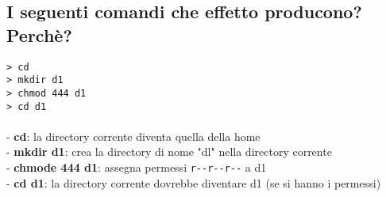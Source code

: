 \subsection{I seguenti comandi che effetto producono? Perch\`e?}
\texttt{> cd	\\
> mkdir d1	\\
> chmod 444	d1	\\
> cd d1	\\}
\\
- \textbf{cd}: la directory corrente diventa quella della home	\\
- \textbf{mkdir d1}: crea la directory di nome "dl" nella directory
corrente	\\
- \textbf{chmode 444 d1}: assegna permessi \verb:r--r--r--: a d1	\\
- \textbf{cd d1}: la directory corrente dovrebbe diventare d1 (se
si hanno i permessi)	\\